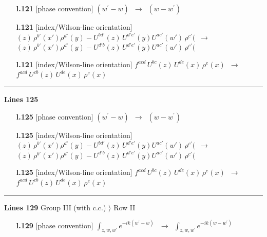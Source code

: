 \documentclass[10pt]{article}
\begin{document}
\begin{itemize}[leftmargin=2.2em,itemsep=1pt,topsep=2pt]
\item[\textbf{l.121}] \textsf{\small [phase convention]} $\displaystyle (w^{\prime}-w)$\ $\longrightarrow$\ $\displaystyle (w-w^{\prime})$
\item[\textbf{l.121}] \textsf{\small [index/Wilson-line orientation]} $\displaystyle (z)\,\rho^{b'}(x')\rho^{d'}(y)-U^{bd'}(z)\,U^{d'e'}(y)U^{ac'}(w')\,\rho^{c'}($\ $\longrightarrow$\ $\displaystyle (z)\,\rho^{b'}(x')\rho^{d'}(y)-U^{d'b}(z)\,U^{d'e'}(y)U^{ac'}(w')\,\rho^{c'}($
\item[\textbf{l.121}] \textsf{\small [index/Wilson-line orientation]} $\displaystyle f^{acd}\, U^{bc}(z)\,U^{de}(x)\,\rho^{e}(x)$\ $\longrightarrow$\ $\displaystyle f^{acd}\, U^{cb}(z)\,U^{de}(x)\,\rho^{e}(x)$
\end{itemize}
\noindent\rule{\linewidth}{0.3pt}\par\noindent\textbf{Lines 125} \par
\begin{itemize}[leftmargin=2.2em,itemsep=1pt,topsep=2pt]
\item[\textbf{l.125}] \textsf{\small [phase convention]} $\displaystyle (w^{\prime}-w)$\ $\longrightarrow$\ $\displaystyle (w-w^{\prime})$
\item[\textbf{l.125}] \textsf{\small [index/Wilson-line orientation]} $\displaystyle (z)\,\rho^{b'}(x')\rho^{d'}(y)-U^{bd'}(z)\,U^{d'e'}(y)U^{ac'}(w')\,\rho^{c'}($\ $\longrightarrow$\ $\displaystyle (z)\,\rho^{b'}(x')\rho^{d'}(y)-U^{d'b}(z)\,U^{d'e'}(y)U^{ac'}(w')\,\rho^{c'}($
\item[\textbf{l.125}] \textsf{\small [index/Wilson-line orientation]} $\displaystyle f^{acd}\, U^{bc}(z)\,U^{de}(x)\,\rho^{e}(x)$\ $\longrightarrow$\ $\displaystyle f^{acd}\, U^{cb}(z)\,U^{de}(x)\,\rho^{e}(x)$
\end{itemize}
\noindent\rule{\linewidth}{0.3pt}\par\noindent\textbf{Lines 129} \quad \textsf{Group III (with c.c.) $\rangle$ Row II} \par
\begin{itemize}[leftmargin=2.2em,itemsep=1pt,topsep=2pt]
\item[\textbf{l.129}] \textsf{\small [phase convention]} $\displaystyle \int_{z,w,w^{\prime}} e^{-ik(w^{\prime}-w)}\,$\ $\longrightarrow$\ $\displaystyle \int_{z,w,w^{\prime}} e^{-ik(w-w^{\prime})}\,$
\end{itemize}
\end{document}
